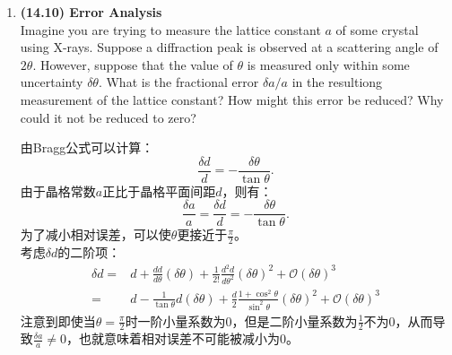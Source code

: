 \documentclass[reqno,a4paper,12pt]{amsart}
\begin{document}
\begin{enumerate}[1.]
\begin{tcolorbox}[breakable, colback = black!5!white, colframe = black]
\begin{enumerate}[(a)]
\end{enumerate}
\end{tcolorbox}

\item \textbf{(14.10) Error Analysis} \\
Imagine you are trying to measure the lattice constant $a$ of some crystal using X-rays. Suppose a diffraction peak is observed at a scattering angle of $2\theta$. However, suppose that the value of $\theta$ is measured only within some uncertainty $\delta \theta$. What is the fractional error $\delta a/a$ in the resultiong measurement of the lattice constant? How might this error be reduced? Why could it not be reduced to zero?
\begin{tcolorbox}[breakable, colback = black!5!white, colframe = black]
由Bragg公式可以计算：
\[
	\frac{\delta d}{d} = -\frac{\delta \theta}{\tan\theta}.
\]
由于晶格常数$a$正比于晶格平面间距$d$，则有：
\[
	\frac{\delta a}{a} = \frac{\delta d}{d} = -\frac{\delta \theta}{\tan\theta}.
\]
为了减小相对误差，可以使$\theta$更接近于$\frac{\pi}{2}$。 \\
考虑$\delta d$的二阶项：
\begin{align*}
	\delta d =& d + \frac{dd}{d\theta}(\delta \theta) + \frac{1}{2!}\frac{d^2d}{d\theta^2} (\delta\theta)^2 + \mathcal{O}(\delta\theta)^3 \\
	=& d - \frac{1}{\tan\theta}d (\delta \theta) + \frac{d}{2} \frac{1+\cos^2\theta}{\sin^2\theta}(\delta \theta)^2 + \mathcal{O}(\delta \theta)^3
\end{align*}
注意到即使当$\theta = \frac{\pi}{2}$时一阶小量系数为0，但是二阶小量系数为$\frac{1}{2}$不为0，从而导致$\frac{\delta a}{a} \neq 0$，也就意味着相对误差不可能被减小为0。
\end{tcolorbox}

\end{enumerate}
\end{document}
